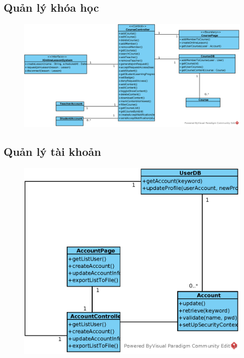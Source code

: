 \documentclass[./../main_file.tex]{subfiles}
\begin{document}
\subsection{Quản lý khóa học}
\begin{figure}[H]
	\centering
	\includegraphics[width=\linewidth]{./images/define_operations/ucd_method_create_live_lesson.eps}
\end{figure}
\subsection{Quản lý tài khoản}
\begin{figure}[H]
	\centering
	\includegraphics[width=\linewidth]{./images/define_operations/ucd_method_ss_account_manage.eps}
\end{figure}
\end{document}
